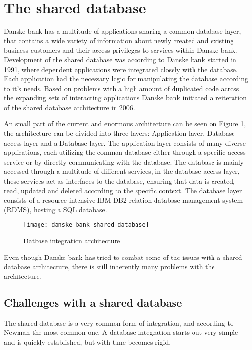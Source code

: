 \section{The shared database}
Danske bank has a multitude of applications sharing a common database layer, that contains a wide variety of information about newly created and existing business customers and their access privileges to services within Danske bank. Development of the shared database was according to Danske bank started in 1991, where dependent applications were integrated closely with the database. Each application had the necessary logic for manipulating the database according to it's needs. Based on problems with a high amount of duplicated code across the expanding sets of interacting applications Danske bank initiated a reiteration of the shared database architecture in 2006. 

An small part of the current and enormous architecture can be seen on Figure \ref{fig:danske_bank_shared_database}, the architecture can be divided into three layers: Application layer, Database access layer and a Database layer. The application layer consists of many diverse applications, each utilizing the common database either through a specific access service or by directly communicating with the database. The database is mainly accessed through a multitude of different services, in the database access layer, these services act as interfaces to the database, ensuring that data is created, read, updated and deleted according to the specific context. The database layer consists of a resource intensive IBM DB2 relation database management system (RDMS), hosting a SQL database. 


\begin{figure}[!htb]
  \texttt{[image: danske\_bank\_shared\_database]}  
  \caption{Datbase integration architecture}
  \label{fig:danske_bank_shared_database}
\end{figure}


Even though Danske bank has tried to combat some of the issues with a shared database architecture, there is still inherently many problems with the architecture. 

\subsection{Challenges with a shared database}
The shared database is a very common form of integration, and according to Newman the most common one\cite[p.~41]{newman2015microservices}. A database integration starts out very simple and is quickly established, but with time becomes rigid.

